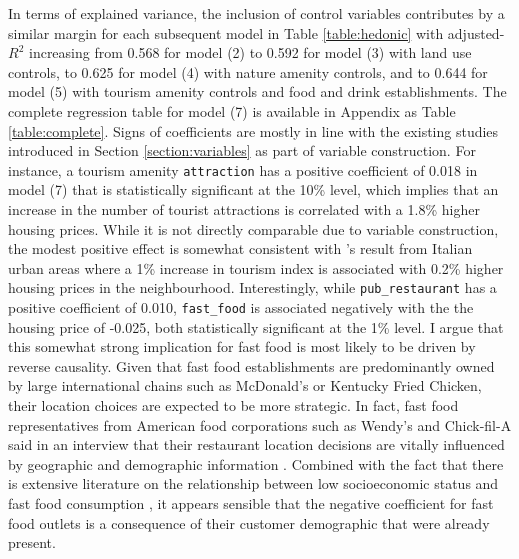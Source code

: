 \documentclass{article}
\begin{document}
In terms of explained variance, the inclusion of control variables contributes by a similar margin for each subsequent model in Table \ref{table:hedonic} with adjusted-$R^2$ increasing from 0.568 for model (2) to 0.592 for model (3) with land use controls, to 0.625 for model (4) with nature amenity controls, and to 0.644 for model (5) with tourism amenity controls and food and drink establishments. The complete regression table for model (7) is available in Appendix as Table \ref{table:complete}. Signs of coefficients are mostly in line with the existing studies introduced in Section \ref{section:variables} as part of variable construction. For instance, a tourism amenity \texttt{attraction} has a positive coefficient of 0.018 in model (7) that is statistically significant at the 10\% level, which implies that an increase in the number of tourist attractions is correlated with a 1.8\% higher housing prices. While it is not directly comparable due to variable construction, the modest positive effect is somewhat consistent with \citet{Biagi2015DoesItaly}'s result from Italian urban areas where a 1\% increase in tourism index is associated with 0.2\% higher housing prices in the neighbourhood. Interestingly, while \texttt{pub\_restaurant} has a positive coefficient of 0.010, \texttt{fast\_food} is associated negatively with the the housing price of -0.025, both statistically significant at the 1\% level. I argue that this somewhat strong implication for fast food is most likely to be driven by reverse causality. Given that fast food establishments are predominantly owned by large international chains such as McDonald's or Kentucky Fried Chicken, their location choices are expected to be more strategic. In fact, fast food representatives from American food corporations such as Wendy's and Chick-fil-A said in an interview that their restaurant location decisions are vitally influenced by geographic and demographic information \citep{Ungerleider2014HowLocation}. Combined with the fact that there is extensive literature on the relationship between low socioeconomic status and fast food consumption \citep{Appelhans2012SocioeconomicPurchases.}, it appears sensible that the negative coefficient for fast food outlets  is a consequence of their customer demographic that were already present.\\\\
\end{document}
